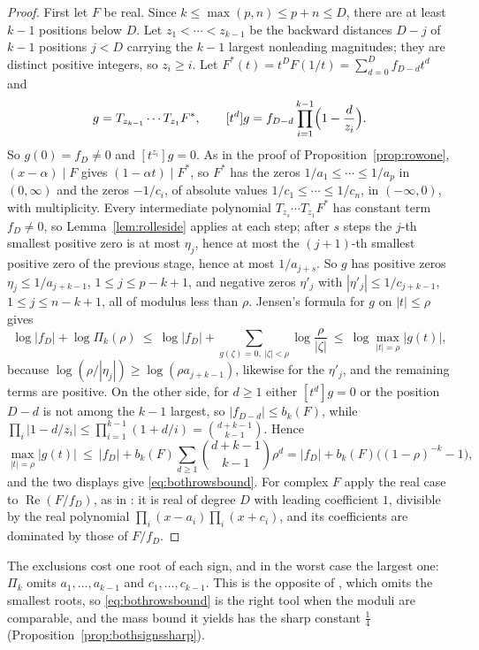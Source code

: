 \documentclass[11pt]{article}
\begin{document}
\begin{proof}
First let $F$ be real.  Since $k\le\max(p,n)\le p+n\le D$, there are at least
$k-1$ positions below $D$.  Let $z_1<\cdots<z_{k-1}$ be the backward distances
$D-j$ of $k-1$ positions $j<D$ carrying the $k-1$ largest nonleading
magnitudes; they are distinct positive integers, so $z_i\ge i$.  Let
$F^*(t)=t^DF(1/t)=\sum_{d=0}^Df_{D-d}t^d$ and
\[
  g=T_{z_{k-1}}\cdots T_{z_1}F^*,\qquad
  [t^d]g=f_{D-d}\prod_{i=1}^{k-1}\Bigl(1-\frac d{z_i}\Bigr).
\]
So $g(0)=f_D\ne0$ and $[t^{z_i}]g=0$.  As in the proof of
Proposition~\ref{prop:rowone}, $(x-\alpha)\mid F$ gives $(1-\alpha t)\mid F^*$,
so $F^*$ has the zeros $1/a_1\le\cdots\le1/a_p$ in $(0,\infty)$ and the zeros
$-1/c_i$, of absolute values $1/c_1\le\cdots\le1/c_n$, in $(-\infty,0)$, with
multiplicity.  Every intermediate polynomial $T_{z_s}\cdots T_{z_1}F^*$ has
constant term $f_D\ne0$, so Lemma~\ref{lem:rolleside} applies at each step;
after $s$ steps the $j$-th smallest positive zero is at most $\eta_j$, hence
at most the $(j+1)$-th smallest positive zero of the previous stage, hence at most $1/a_{j+s}$.  So $g$ has positive
zeros $\eta_j\le1/a_{j+k-1}$, $1\le j\le p-k+1$, and negative zeros
$\eta'_j$ with $|\eta'_j|\le1/c_{j+k-1}$, $1\le j\le n-k+1$, all of modulus
less than $\rho$.  Jensen's formula for $g$ on $|t|\le\rho$ gives
\[
  \log|f_D|+\log\Pi_k(\rho)\ \le\
  \log|f_D|+\sum_{g(\zeta)=0,\ |\zeta|<\rho}\log\frac\rho{|\zeta|}\ \le\
  \log\max_{|t|=\rho}|g(t)|,
\]
because $\log(\rho/|\eta_j|)\ge\log(\rho a_{j+k-1})$, likewise for the
$\eta'_j$, and the remaining terms are positive.  On the other side, for
$d\ge1$ either $[t^d]g=0$ or the position $D-d$ is not among the $k-1$ largest,
so $|f_{D-d}|\le b_k(F)$, while
$\prod_i|1-d/z_i|\le\prod_{i=1}^{k-1}(1+d/i)=\binom{d+k-1}{k-1}$.  Hence
\[
  \max_{|t|=\rho}|g(t)|\ \le\ |f_D|+b_k(F)\sum_{d\ge1}\binom{d+k-1}{k-1}\rho^d
  =|f_D|+b_k(F)\bigl((1-\rho)^{-k}-1\bigr),
\]
and the two displays give \eqref{eq:bothrowsbound}.  For complex $F$ apply the
real case to $\operatorname{Re}(F/f_D)$, as in \cite[Corollary~3.3]{coefficient-mass}: it
is real of degree $D$ with leading coefficient $1$, divisible by the real
polynomial $\prod_i(x-a_i)\prod_i(x+c_i)$, and its coefficients are dominated
by those of $F/f_D$.
\end{proof}

The exclusions cost one root of each sign, and in the worst case the largest
one: $\Pi_k$ omits $a_1,\ldots,a_{k-1}$ and $c_1,\ldots,c_{k-1}$.  This is the
opposite of \cite[Theorem~3.2]{coefficient-mass}, which omits the smallest roots, so
\eqref{eq:bothrowsbound} is the right tool when the moduli are comparable,
and the mass bound it yields has the sharp constant $\frac14$
(Proposition~\ref{prop:bothsignssharp}).
\end{document}
